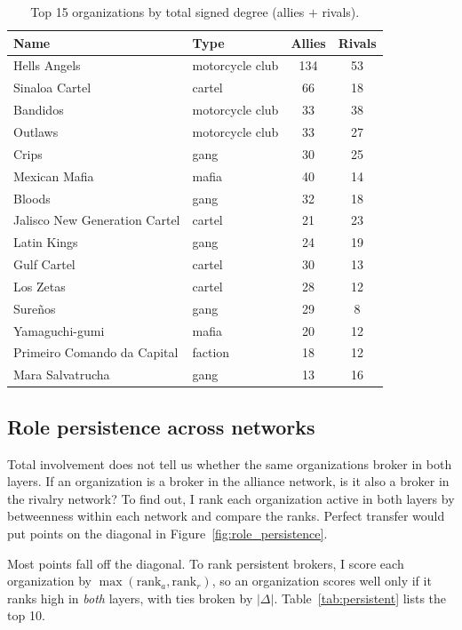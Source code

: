 \documentclass[11pt,a4paper]{article}
\begin{document}
\begin{table}[H]
\centering
\caption{Top 15 organizations by total signed degree (allies $+$ rivals).}
\label{tab:signed}
\small
\begin{tabular}{@{}llcc@{}}
\toprule
\textbf{Name} & \textbf{Type} & \textbf{Allies} & \textbf{Rivals} \\
\midrule
Hells Angels & motorcycle club & 134 & 53 \\
Sinaloa Cartel & cartel & 66 & 18 \\
Bandidos & motorcycle club & 33 & 38 \\
Outlaws & motorcycle club & 33 & 27 \\
Crips & gang & 30 & 25 \\
Mexican Mafia & mafia & 40 & 14 \\
Bloods & gang & 32 & 18 \\
Jalisco New Generation Cartel & cartel & 21 & 23 \\
Latin Kings & gang & 24 & 19 \\
Gulf Cartel & cartel & 30 & 13 \\
Los Zetas & cartel & 28 & 12 \\
Sureños & gang & 29 & 8 \\
Yamaguchi-gumi & mafia & 20 & 12 \\
Primeiro Comando da Capital & faction & 18 & 12 \\
Mara Salvatrucha & gang & 13 & 16 \\
\bottomrule
\end{tabular}
\end{table}


\subsection{Role persistence across networks}

Total involvement does not tell us whether the same organizations broker in both layers. If an organization is a broker in the alliance network, is it also a broker in the rivalry network? To find out, I rank each organization active in both layers by betweenness within each network and compare the ranks. Perfect transfer would put points on the diagonal in Figure~\ref{fig:role_persistence}.

Most points fall off the diagonal. To rank persistent brokers, I score each organization by $\max(\text{rank}_a, \text{rank}_r)$, so an organization scores well only if it ranks high in \emph{both} layers, with ties broken by $|\Delta|$. Table~\ref{tab:persistent} lists the top 10.
\end{document}
